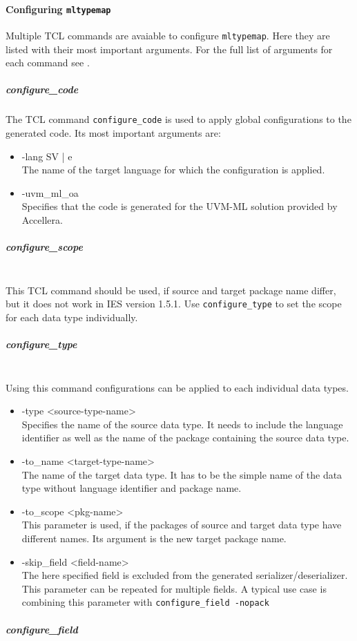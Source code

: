 \paragraph{Configuring \lstinline$mltypemap$} \label{config_mltypemap}
Multiple TCL commands are avaiable to configure \lstinline$mltypemap$. Here they are listed with their most important arguments. For the full list of arguments for each command see \cite{cdnshelp}.
\subparagraph{configure_code}
The TCL command \lstinline$configure_code$ is used to apply global configurations to the generated code. Its most important arguments are:
\begin{itemize}
  \item{-lang SV | e}\\
  The name of the target language for which the configuration is applied.
  \item{-uvm_ml_oa}\\
  Specifies that the code is generated for the UVM-ML solution provided by Accellera.
\end{itemize}
\subparagraph{configure_scope}\\
This TCL command should be used, if source and target package name differ, but it does not work in IES version 1.5.1. Use \lstinline$configure_type$ to set the scope for each data type individually.
\subparagraph{configure_type}\\
Using this command configurations can be applied to each individual data types.
\begin{itemize}
  \item{-type <source-type-name>}\\
  Specifies the name of the source data type. It needs to include the language identifier as well as the name of the package containing the source data type.
  \item{-to_name <target-type-name>}\\
  The name of the target data type. It has to be the simple name of the data type without language identifier and package name.
  \item{-to_scope <pkg-name>}\\
  This parameter is used, if the packages of source and target data type have different names. Its argument is the new target package name.
  \item{-skip_field <field-name>}\\
  The here specified field is excluded from the generated serializer/deserializer. This parameter can be repeated for multiple fields. A typical use case is combining this parameter with \lstinline$configure_field -nopack$
\end{itemize}
\subparagraph{configure_field}
